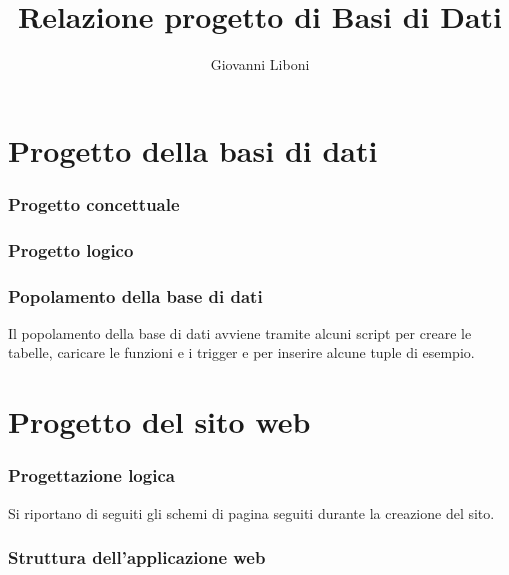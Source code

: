 \documentclass[a4paper,10pt]{report}
\title{Relazione progetto di Basi di Dati}
\author{Giovanni Liboni}
\begin{document}
\begin{frontespizio}



\end{frontespizio}

\tableofcontents

\newpage

\part{Progetto della basi di dati}

\section{Progetto concettuale}

\section{Progetto logico}

\section{Popolamento della base di dati}

Il popolamento della base di dati avviene tramite alcuni script per creare le tabelle, caricare le funzioni e i trigger e per inserire alcune tuple di esempio.

\part{Progetto del sito web}

\section{Progettazione logica}

Si riportano di seguiti gli schemi di pagina seguiti durante la creazione del sito.

\section{Struttura dell'applicazione web}
\end{document}
